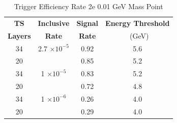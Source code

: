 \begin{table}
 \centering
\caption{Trigger Efficiency Rate 2e 0.01 GeV Mass Point}
\begin{tabular}{ c | c | c | c }
\textbf{TS} & \textbf{Inclusive} & \textbf{Signal} & \textbf{Energy Threshold}  \\ \textbf{Layers} & \textbf{Rate} & \textbf{Rate} & \ (GeV) \\ 
\hline
34 & 2.7 $\times 10^{-5}$ & 0.92 & 5.6 \\ 
20 & & 0.85 & 5.2 \\ 
\hline 
34 & 1 $\times 10^{-5}$ & 0.83 & 5.2 \\ 
20 & & 0.72 & 4.8 \\ 
\hline 
34 & 1 $\times 10^{-6}$ & 0.26 & 4.0 \\ 
20 & & 0.29 & 4.0 \\ 
\hline 
\end{tabular}
\end{table}
